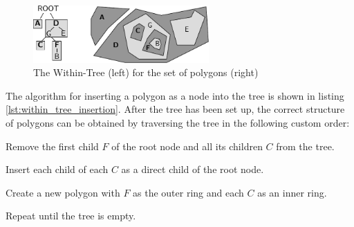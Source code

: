 \begin{figure}[ht]
  \vspace{1em}
  \centering
  \includegraphics[width=0.6\textwidth]{graphics/development/application/within_tree}
  \caption{The Within-Tree (left) for the set of polygons (right)}
  \label{fig:within_tree}
\end{figure}

The algorithm for inserting a polygon as a node into the tree is shown in listing \ref{lst:within_tree_insertion}. After the tree has been set up, the correct structure of polygons can be obtained by traversing the tree in the following custom order:

\begin{compactenum}
  \item Remove the first child $F$ of the root node and all its children $C$ from the tree.
  \item Insert each child of each $C$ as a direct child of the root node.
  \item Create a new polygon with $F$ as the outer ring and each $C$ as an inner ring.
  \item Repeat until the tree is empty.
\end{compactenum}



